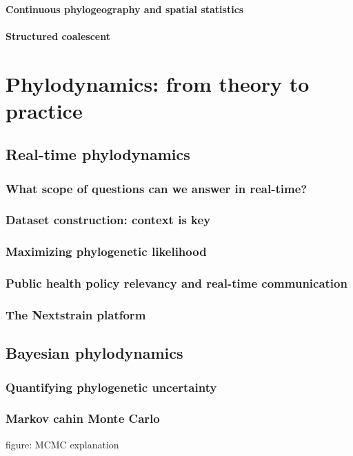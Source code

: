         \paragraph*{Continuous phylogeography and spatial statistics}
        \paragraph*{Structured coalescent}

  \section{Phylodynamics: from theory to practice}

    \subsection{Real-time phylodynamics}
      \subsubsection{What scope of questions can we answer in real-time?}
      \subsubsection{Dataset construction: context is key}
      \subsubsection{Maximizing phylogenetic likelihood}
      \subsubsection{Public health policy relevancy and real-time communication}
      \subsubsection{The Nextstrain platform}
    \subsection{Bayesian phylodynamics}
      \subsubsection{Quantifying phylogenetic uncertainty}
      \subsubsection{Markov cahin Monte Carlo}
      figure: MCMC explanation
